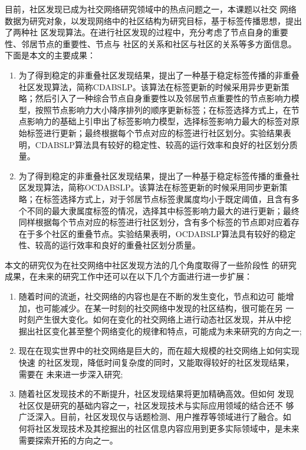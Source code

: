 \begin{conclusion}
目前，社区发现已成为社交网络研究领域中的热点问题之一，本课题以社交
网络数据为研究对象，以发现网络中的社区结构为研究目标，基于标签传播思想，提出了两种社
区发现算法。在进行社区发现的过程中，充分考虑了节点自身的重要性、邻居节点的重要性、节点与
社区的关系和社区与社区的关系等多方面信息。
下面是本文的主要成果：
\begin{enumerate}
    \item 为了得到稳定的非重叠社区发现结果，提出了一种基于稳定标签传播的非重叠社区发现算法，简称CDABSLP。该算法在标签更新的时候采用异步更新策略；然后引入了一种综合节点自身重要性以及邻居节点重要性的节点影响力模型，按照节点影响力大小降序排列的顺序更新标签；在标签选择方式上，在节点影响力的基础上引申出了标签影响力模型，选择标签影响力最大的标签对原始标签进行更新；最终根据每个节点对应的标签进行社区划分。实验结果表明，CDABSLP算法具有较好的稳定性、较高的运行效率和良好的社区划分质量。
    \item 为了得到稳定的非重叠社区发现结果，提出了一种基于稳定标签传播的重叠社区发现算法，简称OCDABSLP。该算法在标签更新的时候采用同步更新策略；在标签选择方式上，对于邻居节点标签隶属度均小于既定阈值，且含有多个不同的最大隶属度标签的情况，选择其中标签影响力最大的进行更新；最终同样根据每个节点对应的标签进行社区划分，含有多个标签的节点即对应着存在于多个社区的重叠节点。实验结果表明，OCDABSLP算法具有较好的稳定性、较高的运行效率和良好的重叠社区划分质量。
\end{enumerate}

本文的研究仅为在社交网络中社区发现方法的几个角度取得了一些阶段性
的研究成果，在未来的研究工作中还可以在以下几个方面进行进一步扩展：

\begin{enumerate}
    \item 随着时间的流逝，社交网络的内容也是在不断的发生变化，节点和边可
    能增加，也可能减少。在某一时刻的社交网络中发现的社区结构，很可能在另
    一时刻产生很大变化。如何在变化的社交网络上进行动态社区发现，并从中挖
    掘出社区变化甚至整个网络变化的规律和特点，可能成为未来研究的方向之一;
    \item 现在在现实世界中的社交网络是巨大的，而在超大规模的社交网络上如何实现快速
    的社区发现，降低时间复杂度的同时，又能取得较好的社区发现结果，需要在
    未来进一步深入研究;
    \item 随着社区发现技术的不断提升，社区发现结果将更加精确高效。但如何
    发现社区仅是研究的基础内容之一，社区发现技术与实际应用领域的结合还不
    够广泛深入。目前，社区发现仅与话题检测、用户推荐等领域进行了融合。如
    何将社区发现技术及其挖掘出的社区信息内容应用到更多实际领域中，是未来
    需要探索开拓的方向之一。
\end{enumerate}

\end{conclusion}